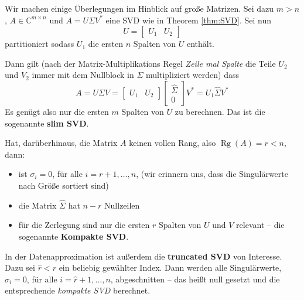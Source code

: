 \documentclass[
]{book}
\providecommand{\tightlist}{%
  \setlength{\itemsep}{0pt}\setlength{\parskip}{0pt}}
\theoremstyle{definition}
\theoremstyle{definition}
\theoremstyle{definition}
\theoremstyle{definition}
\theoremstyle{remark}
\begin{document}
Wir machen einige Überlegungen im Hinblick auf große Matrizen. Sei dazu \(m>n\), \(A\in \mathbb C^{m\times n}\) und \(A=U\Sigma V^*\) eine SVD wie in Theorem \ref{thm:SVD}. Sei nun
\begin{equation*}
U = \begin{bmatrix}
U_1 & U_2
\end{bmatrix}
\end{equation*}
partitioniert sodass \(U_1\) die ersten \(n\) Spalten von \(U\) enthält.

Dann gilt (nach der Matrix-Multiplikations Regel \emph{Zeile mal Spalte} die Teile \(U_2\) und \(V_2\) immer mit dem Nullblock in \(\Sigma\) multipliziert werden) dass
\begin{equation*}
A = U\Sigma V = 
\begin{bmatrix}
U_1 & U_2
\end{bmatrix}
\begin{bmatrix}
\hat \Sigma \\ 0
\end{bmatrix}
V^*
=
U_1 
\hat \Sigma
V^*
\end{equation*}
Es genügt also nur die ersten \(m\) Spalten von \(U\) zu berechnen. Das ist die sogenannte \textbf{slim SVD}.

Hat, darüberhinaus, die Matrix \(A\) keinen vollen Rang, also \(\operatorname{Rg}(A) = r < n\), dann:

\begin{itemize}
\tightlist
\item
  ist \(\sigma_i=0\), für alle \(i=r+1, \dotsc, n\), (wir erinnern uns, dass die Singulärwerte nach Größe sortiert sind)
\item
  die Matrix \(\hat \Sigma\) hat \(n-r\) Nullzeilen
\item
  für die Zerlegung sind nur die ersten \(r\) Spalten von \(U\) und \(V\) relevant -- die sogenannte \textbf{Kompakte SVD}.
\end{itemize}

In der Datenapproximation ist außerdem die \textbf{truncated SVD} von Interesse. Dazu sei \(\hat r<r\) ein beliebig gewählter Index. Dann werden alle Singulärwerte, \(\sigma_i=0\), für alle \(i=\hat r+1, \dotsc, n\), abgeschnitten -- das heißt null gesetzt und die entsprechende \emph{kompakte SVD} berechnet.
\end{document}
